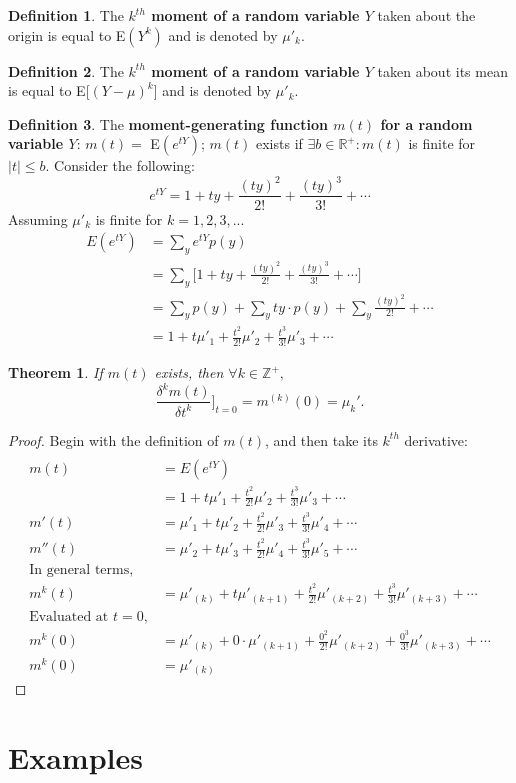 \documentclass[a4paper]{article}
\newtheorem{thm}{Theorem}
\theoremstyle{definition}
\newtheorem{defn}{Definition}[section]
\begin{document}
\begin{defn} %
The \textbf{$k^{th}$ moment of a random variable $Y$} taken about the origin is equal to E$(Y^k)$ and is denoted by $\mu'_{k}.$
\end{defn}
\bigbreak
\begin{defn} %
The \textbf{$k^{th}$ moment of a random variable $Y$} taken about its mean is equal to E[$(Y-\mu)^k$] and is denoted by $\mu'_{k}.$
\end{defn}
\bigbreak
\begin{defn} %
The \textbf{moment-generating function $m(t)$ for a random variable $Y$}: $m(t)=$ E$(e^{tY})$; $m(t)$ exists if $\exists b \in \mathbb{R}^+: m(t)$ is finite for $|t| \le b.$
\bigbreak
Consider the following:
$$e^{tY} = 1+ty+\frac{(ty)^2}{2!}+\frac{(ty)^3}{3!}+ \cdots$$
\quad Assuming $\mu'_k$ is finite for $k = 1,2,3,...$
\begin{align*}
E(e^{tY})&= \sum_y e^{tY}p(y) \\
{}&= \sum_y \bigg[1+ty+\frac{(ty)^2}{2!}+\frac{(ty)^3}{3!}+ \cdots\bigg] \\
{}&= \sum_y p(y) +\sum_y ty\cdot p(y) + \sum_y\frac{(ty)^2}{2!}+\cdots \\
{}&= 1+ t\mu'_1 + \frac{t^2}{2!}\mu'_2 + \frac{t^3}{3!}\mu'_3 + \cdots
\end{align*}
\end{defn} %
\bigbreak
\begin{thm} If $m(t)$ exists, then $\forall k \in \mathbb{Z}^+,$
$$\frac{\delta^k m(t)}{\delta t^k} \bigg]_{t=0} = m^{(k)}(0) = \mu_k'.$$
\end{thm}
\begin{proof} Begin with the definition of $m(t)$, and then take its $k^{th}$ derivative:
\begin{align*}
\\m(t)&=E(e^{tY})
\\{}&=1+ t\mu'_1 + \frac{t^2}{2!}\mu'_2 + \frac{t^3}{3!}\mu'_3 + \cdots
\\m'(t)&=\mu'_1+ t\mu'_2 + \frac{t^2}{2!}\mu'_3 + \frac{t^3}{3!}\mu'_4+\cdots
\\m''(t)&=\mu'_2+ t\mu'_3 + \frac{t^2}{2!}\mu'_4 + \frac{t^3}{3!}\mu'_5+\cdots
\\\text{In general terms,}
\\m^{k}(t)&=\mu'_{(k)}+ t\mu'_{(k+1)} + \frac{t^2}{2!}\mu'_{(k+2)} + \frac{t^3}{3!}\mu'_{(k+3)}+\cdots
\\\text{Evaluated at }t=0,
\\m^{k}(0)&=\mu'_{(k)}+ 0\cdot \mu'_{(k+1)} + \frac{0^2}{2!}\mu'_{(k+2)} + \frac{0^3}{3!}\mu'_{(k+3)}+\cdots
\\m^{k}(0)&=\mu'_{(k)}
\end{align*}
\end{proof}

\section{Examples}
\end{document}
